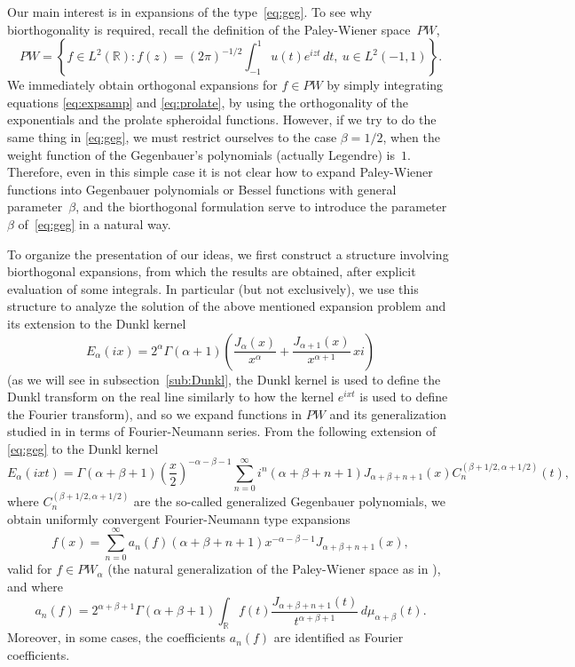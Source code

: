 \documentclass[11pt,a4paper]{amsart}
\theoremstyle{plain}
\theoremstyle{definition}
\newcommand{\R}{\mathbb{R}}
\begin{document}
Our main interest is in expansions of the type~\eqref{eq:geg}. To see why biorthogonality is required, recall the definition of the Paley-Wiener space~$PW$,
\begin{equation*}
  PW = \left\{f\in L^2(\R): f(z) = (2\pi)^{-1/2}\int_{-1}^1 u(t)e^{izt}\, dt ,\ u\in L^2(-1,1)\right\}.
\end{equation*}
We immediately obtain orthogonal expansions for $f\in PW$ by simply integrating equations \eqref{eq:expsamp} and \eqref{eq:prolate}, by using the orthogonality of the exponentials and the prolate spheroidal functions. However, if we try to do the same thing in \eqref{eq:geg}, we must restrict ourselves to the case $\beta=1/2$, when the weight function of the Gegenbauer's polynomials (actually Legendre) is~$1$. Therefore, even in this simple case it is not clear how to expand Paley-Wiener functions into Gegenbauer polynomials or Bessel functions with general parameter~$\beta$, and the biorthogonal formulation serve to introduce the parameter $\beta$ of~\eqref{eq:geg} in a natural way.

To organize the presentation of our ideas, we first construct a structure involving biorthogonal expansions, from which the results are obtained, after explicit evaluation of some integrals. In particular (but not exclusively), we use this structure to analyze the solution of the above mentioned expansion problem and its extension to the Dunkl kernel
\begin{equation*}
  E_{\alpha}(ix) = 2^{\alpha}\Gamma(\alpha+1)
  \left( \frac{J_{\alpha}(x)}{x^{\alpha}}+\frac{J_{\alpha+1}(x)}
  {x^{\alpha+1}}\,xi\right)
\end{equation*}
(as we will see in subsection~\ref{sub:Dunkl}, the Dunkl kernel is used to define the Dunkl transform on the real line similarly to how the kernel $e^{ixt}$ is used to define the Fourier transform),
and so we expand functions in $PW$ and its generalization studied in \cite{CV} in terms of Fourier-Neumann series.
From the following extension of \eqref{eq:geg} to the Dunkl kernel
\begin{equation*}
  E_\alpha(ixt) = \Gamma(\alpha+\beta+1) \left(\frac{x}{2}\right)^{-\alpha-\beta-1}
  \sum_{n=0}^\infty i^n (\alpha+\beta+n+1)J_{\alpha+\beta+n+1}(x)
  C_n^{(\beta+1/2,\alpha+1/2)}(t),
\end{equation*}
where $C_n^{(\beta+1/2,\alpha+1/2)}$ are the so-called generalized Gegenbauer polynomials, 
we obtain uniformly convergent Fourier-Neumann type expansions
\begin{equation*}
  f(x) = \sum_{n=0}^\infty a_n(f)(\alpha+\beta+n+1)x^{-\alpha-\beta-1}J_{\alpha+\beta+n+1}(x),
\end{equation*}
valid for $f\in PW_\alpha$ (the natural generalization of the Paley-Wiener space as in \cite{CV}), and where
\begin{equation*}
  a_n(f) = 2^{\alpha+\beta+1} \Gamma(\alpha+\beta+1)
  \int_{\R} f(t) \frac{J_{\alpha+\beta+n+1}(t)}{t^{\alpha+\beta+1}} \,d\mu_{\alpha+\beta}(t).
\end{equation*}
Moreover, in some cases, the coefficients $a_n(f)$ are identified as Fourier coefficients.
\end{document}
